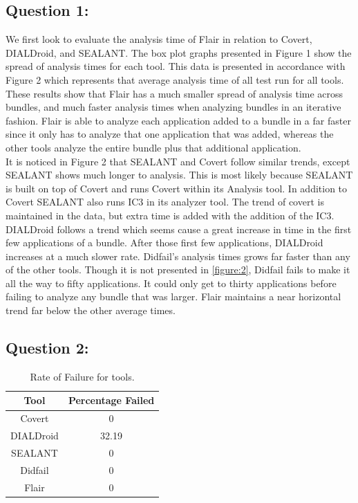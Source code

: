 \documentclass[twocolumn]{article}
\begin{document}
	\subsection{Question 1:}
		We first look to evaluate the analysis time of Flair in relation to Covert, DIALDroid, and SEALANT. The box plot graphs presented in Figure 1 show the spread of analysis times for each tool. This data is presented in accordance with Figure 2 which represents that average analysis time of all test run for all tools. These results show that Flair has a much smaller spread of analysis time across bundles, and much faster analysis times when analyzing bundles in an iterative fashion. Flair is able to analyze each application added to a bundle in a far faster since it only has to analyze that one application that was added, whereas the other tools analyze the entire bundle plus that additional application.\\
		It is noticed in Figure 2 that SEALANT and Covert follow similar trends, except SEALANT shows much longer to analysis. This is most likely because SEALANT is built on top of Covert and runs Covert within its Analysis tool. In addition to Covert SEALANT also runs IC3 in its analyzer tool. The trend of covert is maintained in the data, but extra time is added with the addition of the IC3. DIALDroid follows a trend which seems cause a great increase in time in the first few applications of a bundle. After those first few applications, DIALDroid increases at a much slower rate. Didfail's analysis times grows far faster than any of the other tools. Though it is not presented in \ref{figure:2}, Didfail fails to make it all the way to fifty applications. It could only get to thirty applications before failing to analyze any bundle that was larger. Flair maintains a near horizontal trend far below the other average times.
		
	\subsection{Question 2:}
	
		\begin{table}[h]
		\begin{center}
			\begin{tabular}{ |c c| }
				\hline
				Tool & Percentage Failed\\
				\hline
				Covert & 0\\
				DIALDroid & 32.19\\
				SEALANT & 0\\
				Didfail & 0\\
				Flair & 0\\
				\hline
			\end{tabular}		
			\end{center}
			\label{table:2}
			\caption{Rate of Failure for tools.}
		\end{table}
		
\end{document}
